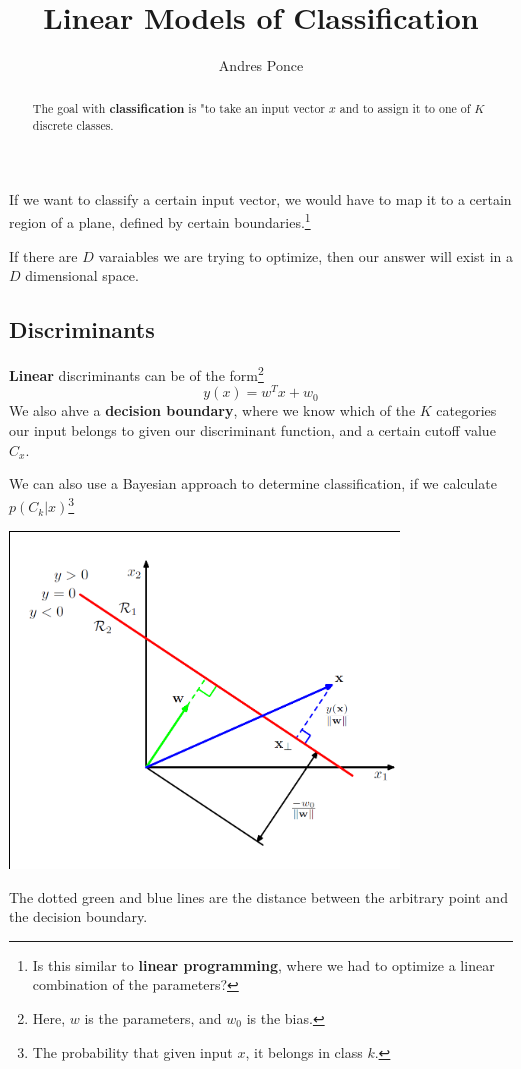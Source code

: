 \documentclass{tufte-handout}
\title{Linear Models of Classification}
\author{Andres Ponce}
\begin{document}
\maketitle
\begin{abstract}
	The goal with \textbf{classification} is "to take 
	an input vector $x$ and to assign it to one of $K$
	discrete classes.
\end{abstract}

If we want to classify a certain input vector, we would have 
to map it to a certain region of a plane, defined by certain 
boundaries.\footnote{Is this similar to \textbf{linear programming},
where we had to optimize a linear combination of the parameters?}

If there are $D$ varaiables we are trying to optimize, then our 
answer will exist in a $D$ dimensional space. 
\subsection{Discriminants}
\textbf{Linear} discriminants can be of the form\footnote{Here, 
$w$ is the parameters, and $w_{0}$ is the bias.}
\[ y(x) = w^{T}x + w_{0}\]
We also ahve a \textbf{decision boundary}, where we know which of the
$K$ categories our input belongs to given our discriminant function,
and a certain cutoff value $C_{x}$.

We can also use a Bayesian approach to determine classification, if we 
calculate $p(C_{k}|x)$\footnote{The probability that given input $x$, 
it belongs in class $k$.}
\begin{marginfigure}
	\includegraphics[width=\linewidth]{dec_boundary}
	\caption{The dotted green and blue lines are the 
		distance between the arbitrary point and the 
		decision boundary.}
\end{marginfigure}
\end{document}
